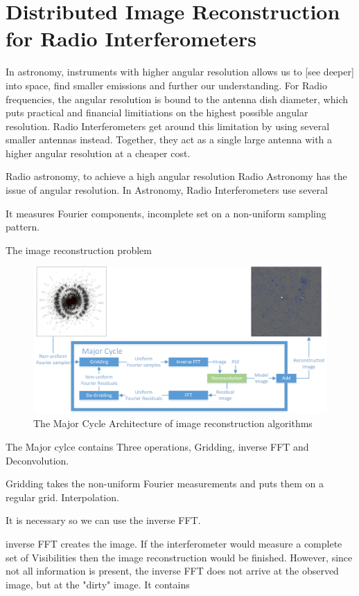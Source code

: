 \pagebreak
\section{Distributed Image Reconstruction for Radio Interferometers}
In astronomy, instruments with higher angular resolution allows us to [see deeper] into space, find smaller emissions and further our understanding. For Radio frequencies, the angular resolution is bound to the antenna dish diameter, which puts practical and financial limitiations on the highest possible angular resolution. Radio Interferometers get around this limitation by using several smaller antennas instead. Together, they act as a single large antenna with a higher angular resolution at a cheaper cost.


Radio astronomy, to achieve a high angular resolution 
Radio Astronomy has the issue of angular resolution. 
In Astronomy, Radio Interferometers use several 

It measures Fourier components, incomplete set on a non-uniform sampling pattern.

The image reconstruction problem


\begin{figure}[h]
	\centering
	\includegraphics[width=0.80\linewidth]{./chapters/02.hypo/Major-Minor3.png}
	\caption{The Major Cycle Architecture of image reconstruction algorithms}
	\label{hypo:major3}
\end{figure}


The Major cylce contains Three operations, Gridding, inverse FFT and Deconvolution. 

Gridding takes the non-uniform Fourier measurements and puts them on a regular grid. Interpolation.

It is necessary so we can use the inverse FFT.

inverse FFT creates the image. If the interferometer would measure a complete set of Visibilities then the image reconstruction would be finished. However, since not all information is present, the inverse FFT does not arrive at the observed image, but at the "dirty" image. It contains

